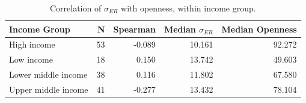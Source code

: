 \begin{table}[H]
\centering
\begin{tabular}{lrrrr}
  \toprule
Income Group & N & Spearman & Median $\sigma_{ER}$ & Median Openness \\ 
  \midrule
High income &   53 & -0.089 & 10.161 & 92.272 \\ 
  Low income &   18 & 0.150 & 13.742 & 49.603 \\ 
  Lower middle income &   38 & 0.116 & 11.802 & 67.580 \\ 
  Upper middle income &   41 & -0.277 & 13.432 & 78.104 \\ 
   \bottomrule
\end{tabular}
\caption{Correlation of $\sigma_{ER}$ with openness, within income group.}
\label{tab:q4}
\end{table}
